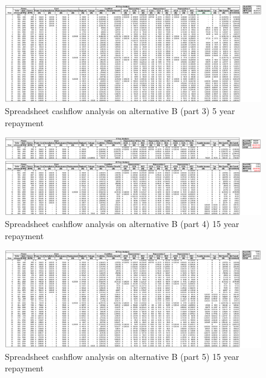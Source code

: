 \documentclass[10pt,letterpaper]{article}
\begin{document}
\begin{figure}[H]
	\centering
	\includegraphics[width=1.0\textwidth]{assets/1534570763068}
	\caption{Spreadsheet cashflow analysis on alternative B (part 3) 5 year repayment}
\end{figure}

\begin{figure}[H]
	\centering
	\includegraphics[width=1.0\textwidth]{assets/1534570784889}
	\caption{Spreadsheet cashflow analysis on alternative B (part 4) 15 year repayment}
\end{figure}

\begin{figure}[H]
	\centering
	\includegraphics[width=1.0\textwidth]{assets/1534570805126}
	\caption{Spreadsheet cashflow analysis on alternative B (part 5) 15 year repayment}
\end{figure}
\end{document}
